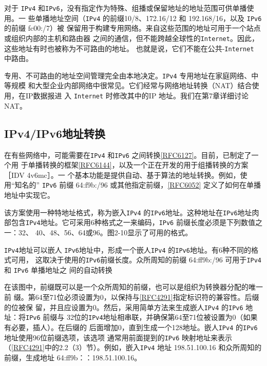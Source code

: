 对于 \verb|IPv4| 和\verb|IPv6|，没有指定作为特殊、组播或保留地址的地址范围可供单播使用。一
些单播地址空间（\verb|IPv4| 的前缀10/8、172.16/12 和 192.168/16，以及 \verb|IPv6|的前缀 fc00:/7）被
保留用于构建专用网络。来自这些范围的地址可用于一个站点或组织内部的主机和路由器
之间的通信，但不能跨越全球性的\verb|Internet|。因此，这些地址有时也被称为不可路由的地址。
也就是说，它们不能在公共-\verb|Internet| 中路由。

专用、不可路由的地址空间管理完全由本地决定。\verb|IPv4| 专用地址在家庭网络、中等规模
和大型企业内部网络中很常见。它们经常与网络地址转换（NAT）结合使用，在IP数据报进
入 \verb|Internet| 时修改其中的IP 地址。我们在第7章详细讨论 NAT。

\subsection{IPv4/IPv6地址转换}
在有些网络中，可能需要在\verb|IPv4| 和\verb|IPv6| 之间转换\href{https://www.rfc-editor.org/rfc/rfc6127}{[RFC6127]}。目前，已制定了一个用
于单播转换的框架\href{https://www.rfc-editor.org/rfc/rfc6144}{[RFC6144]}，以及一个正在开发的用于组播转换的方案［IDV 4v6mc］。一
个基本功能是提供自动、基于算法的地址转换。例如，使用“知名的” \verb|IPv6| 前缀 64:f9b:/96
或其他指定前缀，\href{https://www.rfc-editor.org/rfc/rfc6052}{[RFC6052]} 定义了如何在单播地址中实现它。

该方案使用一种特地址格式，称为嵌入\verb|IPv4| 的\verb|IPv6|地址。这种地址在\verb|IPv6|地址肉
部包含\verb|IPv4|地址。它可采用6种格式之一来编码，\verb|IPv6| 前缀长度必须是下列数值之一：32、
40、48、56、64或96。图2-10显示了可用的格式。

\verb|IPv4|地址可以嵌人 \verb|IPv6|地址中，形成一个嵌人\verb|IPv4| 的\verb|IPv6|地址。有6种不同的格式可用，
这取决于使用的\verb|IPv6|前缀长度。众所周知的前缀 64:ff9b:/96 可用于\verb|IPv4| 和 \verb|IPv6| 单播地址之
间的自动转换

在该图中，前缀既可以是一个众所周知的前缀，也可以是组织为转换器分配的唯一前
缀。第64至71位必须设置为0，以保持与\href{https://www.rfc-editor.org/rfc/rfc4291}{[RFC4291]}指定标识符的兼容性。后缀的位被保
留，并且应设置为0。然后，采用简单方法来生成嵌人\verb|IPv4| 的\verb|IPv6| 地址：将\verb|IPv6| 前缀与
32位的\verb|IPv4|地址相串联，并确保第64至71位被设置为0（如果有必要，插人）。在后缀的
后面增加0，直到生成一个128地址。嵌人\verb|IPv4| 的\verb|IPv6|地址使用96位前缀选项，该选项
通常用前面提到的\verb|IPv6| 映射地址来表示（\href{https://www.rfc-editor.org/rfc/rfc4291}{[RFC4291]}中的2.2（3）节）。例如，嵌入\verb|IPv4| 地址
198.51.100.16 和众所周知的前缀，生成地址 64:ff9b：：198.51.100.16。


